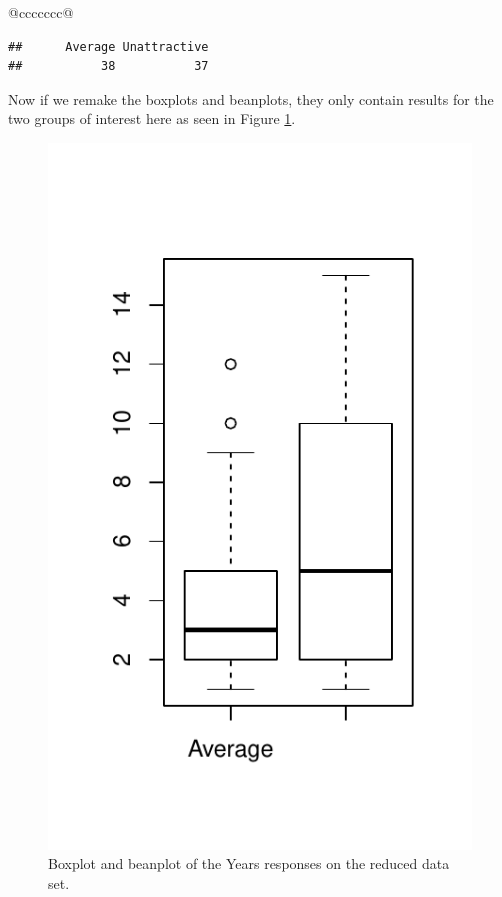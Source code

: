 \documentclass[]{book}
\newenvironment{Shaded}{\begin{snugshade}}{\end{snugshade}}
\newcommand{\KeywordTok}[1]{\textcolor[rgb]{0.13,0.29,0.53}{\textbf{#1}}}
\newcommand{\StringTok}[1]{\textcolor[rgb]{0.31,0.60,0.02}{#1}}
\newcommand{\OperatorTok}[1]{\textcolor[rgb]{0.81,0.36,0.00}{\textbf{#1}}}
\newcommand{\NormalTok}[1]{#1}
\theoremstyle{definition}
\theoremstyle{definition}
\theoremstyle{remark}
\begin{document}
\begin{longtable}[]{@{}ccccccc@{}}
\begin{minipage}[b]{0.10\columnwidth}
\begin{Shaded}
\end{Shaded}

\begin{verbatim}
##      Average Unattractive 
##           38           37
\end{verbatim}

Now if we remake the boxplots and beanplots, they only contain results
for the two groups of interest here as seen in Figure
\ref{fig:Figure2-6}.




\begin{figure}
\centering
\includegraphics{02-reintroductionToStatistics_files/figure-latex/Figure2-6-1.pdf}
\caption{\label{fig:Figure2-6}Boxplot and beanplot of the Years responses on the reduced
data set.}
\end{figure}


\end{minipage}
\end{longtable}
\end{document}
